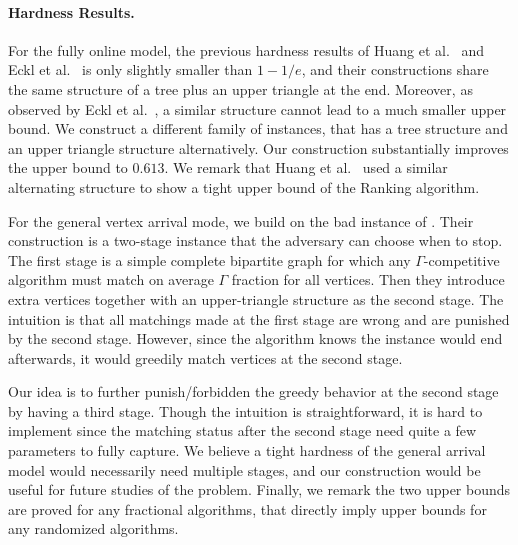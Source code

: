 \paragraph{Hardness Results.}
For the fully online model, the previous hardness results of Huang et al.~\cite{jacm/HuangKTWZZ20} and Eckl et al.~\cite{orl/EcklKLS21} is only slightly smaller than $1-1/e$, and their constructions share the same structure of a tree plus an upper triangle at the end. Moreover, as observed by Eckl et al.~\cite{orl/EcklKLS21}, a similar structure cannot lead to a much smaller upper bound. 
We construct a different family of instances, that has a tree structure and an upper triangle structure alternatively. Our construction substantially improves the upper bound to $0.613$. We remark that Huang et al.~\cite{jacm/HuangKTWZZ20} used a similar alternating structure to show a tight upper bound of the Ranking algorithm. 

For the general vertex arrival mode, we build on the bad instance of \cite{icalp/WangW15}. Their construction is a two-stage instance that the adversary can choose when to stop. The first stage is a simple complete bipartite graph for which any $\Gamma$-competitive algorithm must match on average $\Gamma$ fraction for all vertices. Then they introduce extra vertices together with an upper-triangle structure as the second stage. The intuition is that all matchings made at the first stage are wrong and are punished by the second stage. However, since the algorithm knows the instance would end afterwards, it would greedily match vertices at the second stage.

Our idea is to further punish/forbidden the greedy behavior at the second stage by having a third stage. Though the intuition is straightforward, it is hard to implement since the matching status after the second stage need quite a few parameters to fully capture. We believe a tight hardness of the general arrival model would necessarily need multiple stages, and our construction would be useful for future studies of the problem.
Finally, we remark the two upper bounds are proved for any fractional algorithms, that directly imply upper bounds for any randomized algorithms. 





